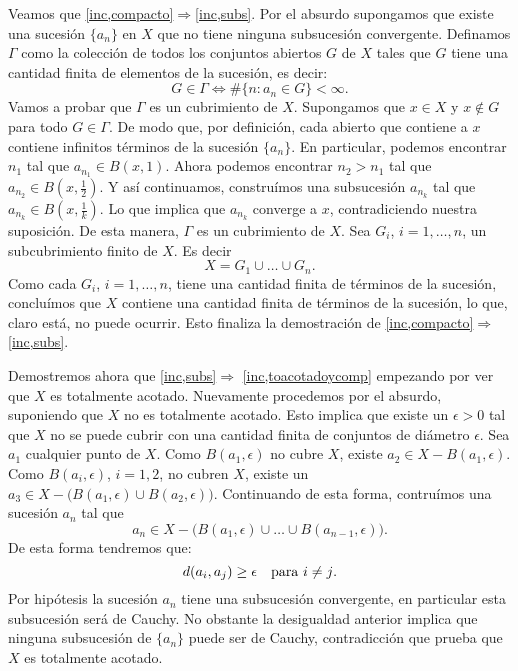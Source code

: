 \begin{demo} Veamos que
\ref{inc,compacto}$\Rightarrow$\ref{inc,subs}. Por el absurdo
supongamos que existe una sucesión $\{a_n\}$ en $X$ que no tiene
ninguna subsucesión convergente. Definamos $\Gamma$ como la
colección de todos los conjuntos abiertos $G$ de $X$ tales que
$G$ tiene una cantidad finita de elementos de la sucesión, es
decir:
\[
G\in\Gamma\Leftrightarrow \#\{n:a_n\in G\}<\infty.
\]
Vamos a probar que $\Gamma$ es un cubrimiento de $X$. Supongamos
que $x\in X$ y $x\notin G$ para todo $G\in\Gamma$. De modo que,
por definición, cada abierto que contiene a $x$ contiene
infinitos términos de la sucesión $\{a_n\}$. En particular,
podemos encontrar $n_1$ tal que $a_{n_1}\in B(x,1)$. Ahora podemos
encontrar $n_2>n_1$ tal que $a_{n_2}\in B(x,\frac12)$. Y así
continuamos, construímos una subsucesión $a_{n_k}$ tal que
$a_{n_k}\in B(x,\frac1k)$. Lo que implica que $a_{n_k}$ converge a
$x$, contradiciendo nuestra suposición. De esta manera,
$\Gamma$ es un cubrimiento de $X$. Sea $G_i$, $i=1,\ldots,n$, un
subcubrimiento finito de $X$. Es decir
\[
	X=G_1\cup\dots\cup G_n.
\]
Como cada $G_i$, $i=1,\ldots,n$, tiene una cantidad finita de
términos de la sucesión, concluímos que $X$
contiene una cantidad finita de términos de la sucesión, lo que,
claro está, no puede ocurrir. Esto finaliza la demostración de
\ref{inc,compacto}$\Rightarrow$\ref{inc,subs}.

Demostremos ahora que \ref{inc,subs}$\Rightarrow$
\ref{inc,toacotadoycomp} empezando por ver que $X$ es totalmente
acotado. Nuevamente procedemos por el absurdo, suponiendo que $X$
no es totalmente acotado. Esto implica que existe un $\epsilon>0$
tal que $X$ no se puede cubrir con una cantidad finita de
conjuntos de diámetro $\epsilon$. Sea $a_1$ cualquier punto de
$X$. Como $B(a_1,\epsilon)$ no cubre $X$, existe $a_2\in
X-B(a_1,\epsilon)$. Como $B(a_i,\epsilon)$, $i=1,2$, no cubren
$X$, existe un $a_3\in X-\bigl(B(a_1,\epsilon)\cup
B(a_2,\epsilon)\bigr)$. Continuando de esta forma, contruímos una
sucesión $a_n$ tal que
\[
	a_n\in X-\big(B(a_1,\epsilon)\cup\dots\cup
	B(a_{n-1},\epsilon)\big).
\]
De esta forma tendremos que:
\[
	d(a_i,a_j)\geq \epsilon\quad\hbox{para $i\neq j$}.
\]
Por hipótesis la sucesión $a_n$ tiene una subsucesión convergente,
en particular esta subsucesión será  de Cauchy. No obstante la desigualdad
anterior implica que ninguna subsucesión de $\{a_n\}$ puede
ser de Cauchy, contradicción que prueba que $X$ es totalmente acotado.


\end{demo}
